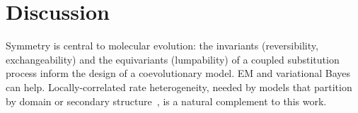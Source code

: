 \documentclass[11pt]{article}
\begin{document}

\section{Discussion}
\label{sec:discussion}

Symmetry is central to molecular evolution: the invariants (reversibility,
exchangeability) and the equivariants (lumpability) of a coupled substitution process
inform the design of a coevolutionary model. EM and variational Bayes can help.
Locally-correlated rate heterogeneity, needed by models that partition by domain or
secondary structure~\citep{LargeHolmes2026,ThorneGoldmanJones96,Yang1995}, is a natural
complement to this work.

\end{document}
